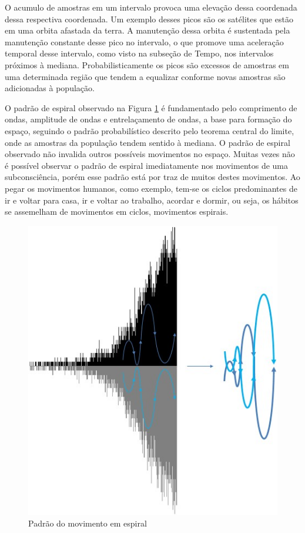 O acumulo de amostras em um intervalo provoca uma elevação dessa coordenada dessa respectiva coordenada. Um exemplo desses picos são os satélites que estão em uma orbita afastada da terra. A manutenção dessa orbita é sustentada pela manutenção constante desse pico no intervalo, o que promove uma aceleração temporal desse intervalo, como visto na subseção de Tempo, nos intervalos próximos à mediana. Probabilisticamente os picos são excessos de amostras em uma determinada região que tendem a equalizar conforme novas amostras são adicionadas à população.

O padrão de espiral observado na Figura \ref{fig:consciousness_space_spiral} é fundamentado pelo comprimento de ondas, amplitude de ondas e entrelaçamento de ondas, a base para formação do espaço, seguindo o padrão probabilístico descrito pelo teorema central do limite, onde as amostras da população tendem sentido à mediana. O padrão de espiral observado não invalida outros possíveis movimentos no espaço. Muitas vezes não é possível observar o padrão de espiral imediatamente nos movimentos de uma subconsciência, porém esse padrão está por traz de muitos destes movimentos. Ao pegar os movimentos humanos, como exemplo, tem-se os ciclos predominantes de ir e voltar para casa, ir e voltar ao trabalho, acordar e dormir, ou seja, os hábitos se assemelham de movimentos em ciclos, movimentos espirais.
	\begin{figure}[H]
	\caption{Padrão do movimento em espiral}
	\label{fig:consciousness_space_spiral}
	\centering
	\includegraphics[scale=.6]{sections/images/consciousness_space_spiral.jpg}
	\end{figure}

